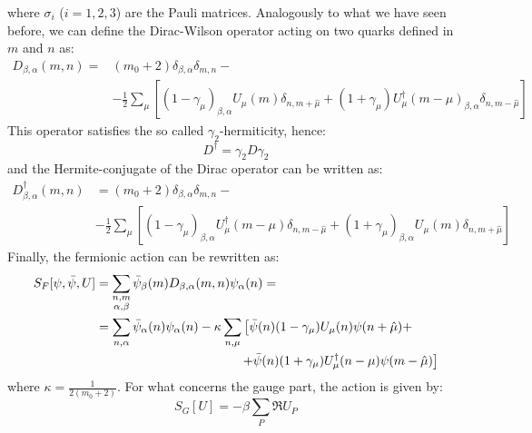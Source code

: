 where $\sigma_i$ ($i = 1, 2, 3$) are the Pauli matrices. Analogously to what we have seen before, we can define the Dirac-Wilson operator acting on two quarks defined in $m$ and $n$ as:
\begin{equation}\label{D}
\begin{split}
        D_{\beta, \alpha} (m, n) = &(m_0 + 2) \delta_{\beta, \alpha} \delta_{m,n} - \\ &- \frac{1}{2}\sum_{\mu} \left[ (1 - \gamma_\mu)_{\beta, \alpha} U_\mu(m) \delta_{n, m+\hat{\mu}} + (1 + \gamma_\mu) U_\mu^\dagger (m - \mu)_{\beta, \alpha} \delta_{n, m - \hat{\mu}} \right]
\end{split}
\end{equation}
This operator satisfies the so called $\gamma_2$-hermiticity, hence:
\begin{equation}
    D^\dagger = \gamma_2 D \gamma_2
\end{equation}
and the Hermite-conjugate of the Dirac operator can be written as:
\begin{equation}\label{D daga}
\begin{split}
         D^\dagger_{\beta, \alpha} (m, n) & = (m_0 + 2) \delta_{\beta, \alpha} \delta_{m,n} - \\ 
         & - \frac{1}{2}\sum_{\mu} \left[ (1 - \gamma_\mu)_{\beta, \alpha} U_\mu^\dagger(m - \mu) \delta_{n, m - \hat{\mu}} + (1 + \gamma_\mu)_{\beta, \alpha} U_\mu (m) \delta_{n, m + \hat{\mu}} \right]
\end{split}
\end{equation}
Finally, the fermionic action can be rewritten as:
\begin{equation}
\begin{split}
    S_F[\psi, \Bar{\psi}, U] & = \sum_{\substack{n, m \\ \alpha, \beta}} \Bar{\psi}_\beta(m) D_{\beta, \alpha}(m, n) \psi_\alpha(n) = \\
    & = \sum_{n, \alpha} \Bar{\psi}_\alpha(n) \psi_\alpha(n) - \kappa \sum_{n, \mu} \left[ \Bar{\psi}(n)(1 - \gamma_\mu) U_\mu(n) \psi(n+\hat{\mu}) + \right. \\ & \hspace{40mm} \left. + \Bar{\psi}(n)(1 + \gamma_\mu) U_\mu^\dagger (n - \mu) \psi(m - \hat{\mu}) \right]
\end{split}
\end{equation}
where $\kappa = \frac{1}{2(m_0 + 2)}$.
For what concerns the gauge part, the action is given by:
\begin{equation}\label{Sg}
        S_G[U] = -\beta \sum_{P} \Re{U_P}
\end{equation}

